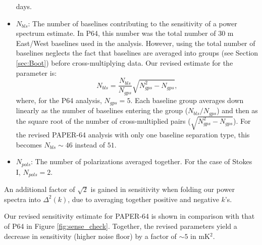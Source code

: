 \documentclass[preprint2,numberedappendix,tighten]{aastex6}  %
\begin{document}
\begin{itemize}
days.
\item $N_{bls}$: The number of baselines contributing to the sensitivity of a power spectrum estimate. In P64, this number was 
the total number of $30$ m East/West baselines used in the analysis. However, using the total number of baselines neglects 
the fact that baselines are averaged into groups (see Section \ref{sec:Boot}) before cross-multiplying data. Our revised estimate for the parameter is:
\begin{equation}
N_{bls} = \frac{N_{bls}}{N_{gps}}\sqrt{N_{gps}^{2}-N_{gps}},
\end{equation}
\noindent where, for the P64 analysis, $N_{gps} = 5$. Each baseline group averages down linearly as the number of baselines 
entering the group ($N_{bls}/N_{gps}$) and then as the square root of the number of cross-multiplied pairs ($\sqrt{N_{gps}^{2} - 
N_{gps}}$). For the revised PAPER-64 analysis with only one baseline separation type, this becomes $N_{bls} \sim 46$ instead 
of $51$. 
\item $N_{pols}$: The number of polarizations averaged together. For the case of Stokes I, $N_{pols}=2$.
\end{itemize}

An additional factor of $\sqrt{2}$ is gained in sensitivity when folding our power spectra into $\Delta^{2}(k)$, due to averaging 
together positive and negative $k$'s. 

Our revised sensitivity estimate for PAPER-64 is shown in comparison with that of P64 in Figure \ref{fig:sense_check}. 
Together, the revised parameters yield a decrease in sensitivity (higher noise floor) by a factor of $\sim5$ in mK$^{2}$. 
\end{document}
